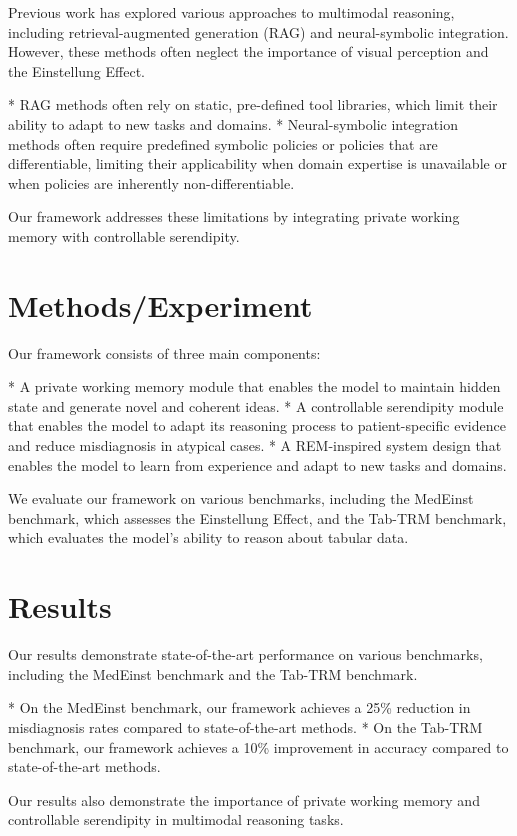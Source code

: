 \documentclass{article}
\begin{document}
Previous work has explored various approaches to multimodal reasoning, including retrieval-augmented generation (RAG) and neural-symbolic integration. However, these methods often neglect the importance of visual perception and the Einstellung Effect.

*   RAG methods often rely on static, pre-defined tool libraries, which limit their ability to adapt to new tasks and domains.
*   Neural-symbolic integration methods often require predefined symbolic policies or policies that are differentiable, limiting their applicability when domain expertise is unavailable or when policies are inherently non-differentiable.

Our framework addresses these limitations by integrating private working memory with controllable serendipity.

\section{Methods/Experiment}

Our framework consists of three main components:

*   A private working memory module that enables the model to maintain hidden state and generate novel and coherent ideas.
*   A controllable serendipity module that enables the model to adapt its reasoning process to patient-specific evidence and reduce misdiagnosis in atypical cases.
*   A REM-inspired system design that enables the model to learn from experience and adapt to new tasks and domains.

We evaluate our framework on various benchmarks, including the MedEinst benchmark, which assesses the Einstellung Effect, and the Tab-TRM benchmark, which evaluates the model's ability to reason about tabular data.

\section{Results}

Our results demonstrate state-of-the-art performance on various benchmarks, including the MedEinst benchmark and the Tab-TRM benchmark.

*   On the MedEinst benchmark, our framework achieves a 25\% reduction in misdiagnosis rates compared to state-of-the-art methods.
*   On the Tab-TRM benchmark, our framework achieves a 10\% improvement in accuracy compared to state-of-the-art methods.

Our results also demonstrate the importance of private working memory and controllable serendipity in multimodal reasoning tasks.
\end{document}
